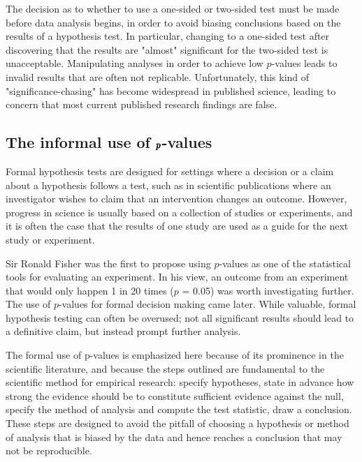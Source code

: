 The decision as to whether to use a one-sided or two-sided test must be made before data analysis begins, in order to avoid biasing conclusions based on the results of a hypothesis test. In particular, changing to a one-sided test after discovering that the results are "almost" significant for the two-sided test is unacceptable. Manipulating analyses in order to achieve low $p$-values leads to invalid results that are often not replicable. Unfortunately, this kind of "significance-chasing" has become widespread in published science, leading to concern that most current published research findings are false.




\textD{\newpage}


\subsection{The informal use of $\pmb{\MakeLowercase{p}}$-values}
\label{informalUseOfp-values}

Formal hypothesis tests are designed for settings where a decision or a claim about a hypothesis follows a test, such as in scientific publications where an investigator wishes to claim that an intervention changes an outcome.  However, progress in science is usually based on a collection of studies or experiments, and it is often the case that the results of one study are used as a guide for the next study or experiment. 

Sir Ronald Fisher was the first to propose using $p$-values as one of the statistical tools for evaluating an experiment.  In his view, an outcome from an experiment that would only happen 1 in 20 times ($p$ = 0.05) was worth investigating further. The use of $p$-values for formal decision making came later.  While valuable, formal hypothesis testing can often be overused; not all significant results should lead to a definitive claim, but instead prompt further analysis.

The formal use of p-values is emphasized here because of its prominence in the scientific literature, and because the steps outlined are fundamental to the scientific method for empirical research: specify hypotheses, state in advance how strong the evidence should be to constitute sufficient evidence against the null, specify the method of analysis and compute the test statistic, draw a conclusion. These steps are designed to avoid the pitfall of choosing a hypothesis or method of analysis that is biased by the data and hence reaches a conclusion that may not be reproducible.


